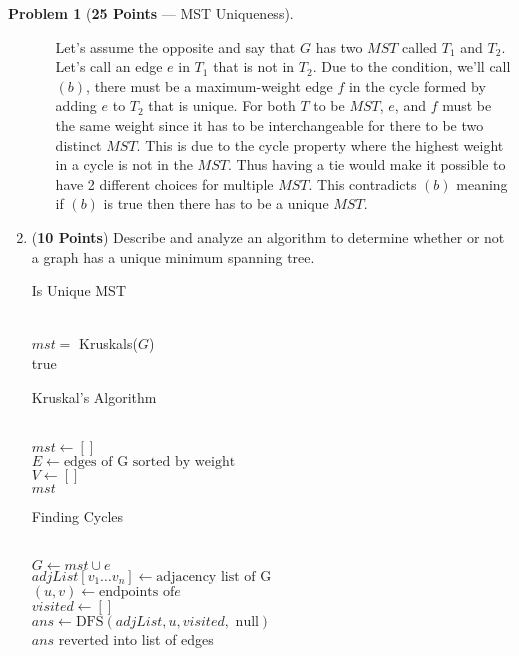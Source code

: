 \documentclass[11pt]{article}
\theoremstyle{definition}
\theoremstyle{theorem}
\newtheorem{prob}{Problem}
\begin{document}
\begin{prob}[\textbf{25 Points} --- MST Uniqueness]
\begin{enumerate}
\begin{enumerate}
            Let's assume the opposite and say that $G$ has two $MST$ called $T_{1}$ and $T_{2}$. Let's call an edge $e$ in $T_{1}$ that is not in $T_{2}$. Due to the condition, we'll call $(b)$, there must be a maximum-weight edge $f$ in the cycle formed by adding $e$ to $T_{2}$ that is unique. For both $T$ to be $MST$, $e$, and $f$ must be the same weight since it has to be interchangeable for there to be two distinct $MST$. This is due to the cycle property where the highest weight in a cycle is not in the $MST$. Thus having a tie would make it possible to have 2 different choices for multiple $MST$. This contradicts $(b)$ meaning if $(b)$ is true then there has to be a unique $MST$.
        \end{enumerate}
        \newpage
        
        \item (\textbf{10 Points}) Describe and analyze an algorithm to determine whether or not a graph has a unique minimum spanning tree. \\
\begin{algorithm}[H]
\caption{Is Unique MST}
 \\ {
    $mst=$ Kruskals($G$) \\
    \KwRet true
}
\end{algorithm}

\begin{algorithm}[H]
\caption{Kruskal's Algorithm}
 \\ {
    $mst \gets []$ \\
    $E \gets \text{edges of G sorted by weight}$ \\
    $V \gets []$ \\
    \KwRet $mst$
}
\end{algorithm}

\begin{algorithm}[H]
\caption{Finding Cycles}
 \\ {
$G \gets mst \cup e$ \\
$adjList[v_1 \ldots v_n] \gets \text{adjacency list of G}$ \\
$(u, v) \gets \text{endpoints of} e$ \\
$visited \gets []$ \\
$ans \gets \text{DFS}(adjList, u, visited, \text{ null})$ \\
\KwRet $ans$ reverted into list of edges
}
\end{algorithm}


\end{enumerate}
\end{prob}
\end{document}
